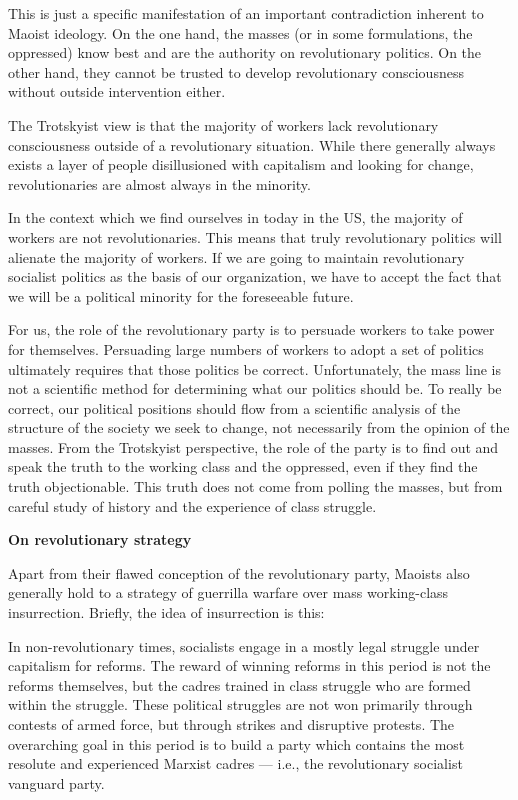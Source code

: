 This is just a specific manifestation of an important contradiction inherent to Maoist ideology. On the one hand, the masses (or in some formulations, the oppressed) know best and are the authority on revolutionary politics. On the other hand, they cannot be trusted to develop revolutionary consciousness without outside intervention either.

The Trotskyist view is that the majority of workers lack revolutionary consciousness outside of a revolutionary situation. While there generally always exists a layer of people disillusioned with capitalism and looking for change, revolutionaries are almost always in the minority.

In the context which we find ourselves in today in the US, the majority of workers are not revolutionaries. This means that truly revolutionary politics will alienate the majority of workers. If we are going to maintain revolutionary socialist politics as the basis of our organization, we have to accept the fact that we will be a political minority for the foreseeable future.

For us, the role of the revolutionary party is to persuade workers to take power for themselves. Persuading large numbers of workers to adopt a set of politics ultimately requires that those politics be correct. Unfortunately, the mass line is not a scientific method for determining what our politics should be. To really be correct, our political positions should flow from a scientific analysis of the structure of the society we seek to change, not necessarily from the opinion of the masses. From the Trotskyist perspective, the role of the party is to find out and speak the truth to the working class and the oppressed, even if they find the truth objectionable. This truth does not come from polling the masses, but from careful study of history and the experience of class struggle.

\textbf{On revolutionary strategy}

Apart from their flawed conception of the revolutionary party, Maoists also generally hold to a strategy of guerrilla warfare over mass working-class insurrection. Briefly, the idea of insurrection is this:

In non-revolutionary times, socialists engage in a mostly legal struggle under capitalism for reforms. The reward of winning reforms in this period is not the reforms themselves, but the cadres trained in class struggle who are formed within the struggle. These political struggles are not won primarily through contests of armed force, but through strikes and disruptive protests. The overarching goal in this period is to build a party which contains the most resolute and experienced Marxist cadres --- i.e., the revolutionary socialist vanguard party.


